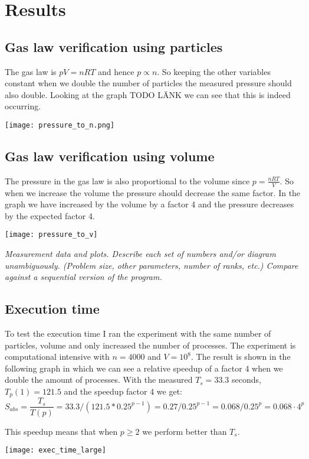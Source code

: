 \documentclass{article}
\begin{document}
\section{Results}


\subsection{Gas law verification using particles}
The gas law is $pV = nRT$ and hence $p \propto n$. So keeping the other variables constant when we double the number of particles the measured pressure should also double. Looking at the graph TODO LÄNK we can see that this is indeed occurring.

\texttt{[image: pressure\_to\_n.png]}


\subsection{Gas law verification using volume}
The pressure in the gas law is also proportional to the volume since $p = \frac{nRT}{V}$. So when we increase the volume the pressure should decrease the same factor. In the graph we have increased by the volume by a factor 4 and the pressure decreases by the expected factor 4. 


\texttt{[image: pressure\_to\_v]}


\emph{Measurement data and plots. Describe each set of numbers and/or diagram unambiguously. (Problem size, other parameters, number of ranks, etc.)
Compare against a sequential version of the program.}



\subsection{Execution time}
To test the execution time I ran the experiment with the same number of particles, volume and only increased the number of processes. The experiment is computational intensive with $n = 4000$ and $V = 10^8$. The result is shown in the following graph in which we can see a relative speedup of a factor 4 when we double the amount of processes. With the measured $T_s = 33.3$ seconds, $T_p(1) = 121.5$ and the speedup factor 4 we get: $$S_{abs} = \frac{T_s}{T(p)} = 33.3 / (121.5 * 0.25^{p-1}) = 0.27 / 0.25^{p-1} = 0.068 / 0.25^p = 0.068 \cdot 4^p$$

This speedup means that when $p \geq 2$ we perform better than $T_s$.

\texttt{[image: exec\_time\_large]}
\end{document}
